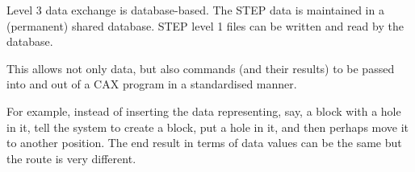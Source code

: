 \normalsize
%
%
%
%
\begin{figure}[hp]
\centering

\end{figure}
\bodsiz

\begin{remarks}
\remintro


   Level 3 data exchange is database-based. The STEP data is maintained
in a (permanent) shared database. STEP level 1 files can be written and read
by the database.


\remend
\end{remarks}

\normalsize
%
%
%
%
\begin{figure}[hp]
\centering

\end{figure}
\bodsiz

\begin{remarks}
\remintro


    This allows not only data, but also commands (and their results)
to be passed into and out of a CAX program in a standardised manner.

    For example, instead of inserting the data representing, say, a block with
a hole in it, tell the system to create a block, put a hole in it, and then 
perhaps move it to another position. The end result in terms of data values
can be the same but the route is very different.

\remend
\end{remarks}

\normalsize
%
%
%
%
\begin{figure}[hp]
\centering

\end{figure}
\bodsiz

